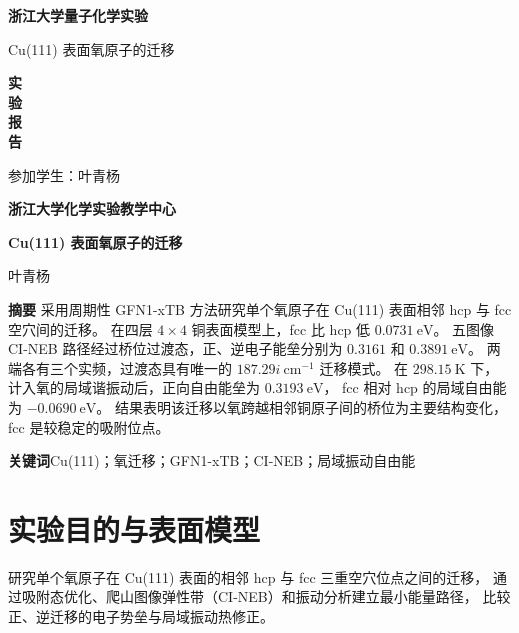 \documentclass[UTF8,a4paper,12pt,fontset=fandol]{ctexart}
\newcommand{\eV}{\mathrm{eV}}
\begin{document}
\begin{titlepage}
\centering\vspace*{1cm}
{\fontsize{24pt}{36pt}\selectfont\bfseries 浙江大学量子化学实验\par}
\vspace{1cm}
{\sffamily\fontsize{18pt}{24pt}\selectfont Cu(111) 表面氧原子的迁移\par}
\vspace{.7cm}
{\sffamily\fontsize{22pt}{28pt}\selectfont\bfseries 实\\[.32cm]验\\[.32cm]报\\[.32cm]告\par}
\vfill
{\fontsize{14pt}{21pt}\selectfont 参加学生：叶青杨\par}
\vspace{1cm}
{\fontsize{18pt}{24pt}\selectfont\bfseries 浙江大学化学实验教学中心\par}
\end{titlepage}
\setcounter{page}{1}\fontsize{12pt}{18pt}\selectfont
\begin{center}
{\sffamily\fontsize{15pt}{22pt}\selectfont\bfseries Cu(111) 表面氧原子的迁移\par}
\vspace{.4em}叶青杨
\end{center}
\noindent\textbf{摘要}\quad
采用周期性 GFN1-xTB 方法研究单个氧原子在 Cu(111) 表面相邻 hcp 与 fcc 空穴间的迁移。
在四层 $4\times4$ 铜表面模型上，fcc 比 hcp 低 $0.0731\ \eV$。
五图像 CI-NEB 路径经过桥位过渡态，正、逆电子能垒分别为 $0.3161$ 和 $0.3891\ \eV$。
两端各有三个实频，过渡态具有唯一的 $187.29i\ \mathrm{cm^{-1}}$ 迁移模式。
在 $298.15\ \mathrm K$ 下，计入氧的局域谐振动后，正向自由能垒为 $0.3193\ \eV$，
fcc 相对 hcp 的局域自由能为 $-0.0690\ \eV$。
结果表明该迁移以氧跨越相邻铜原子间的桥位为主要结构变化，fcc 是较稳定的吸附位点。

\noindent\textbf{关键词}\quad Cu(111)；氧迁移；GFN1-xTB；CI-NEB；局域振动自由能

\section{实验目的与表面模型}
研究单个氧原子在 Cu(111) 表面的相邻 hcp 与 fcc 三重空穴位点之间的迁移，
通过吸附态优化、爬山图像弹性带（CI-NEB）和振动分析建立最小能量路径，
比较正、逆迁移的电子势垒与局域振动热修正\cite{course}。
\end{document}
